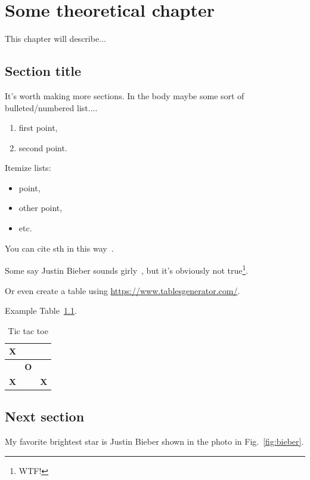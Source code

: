 
\chapter{Some theoretical chapter}

This chapter will describe...

\section{Section title}

It's worth making more sections.
In the body maybe some sort of bulleted/numbered list....

\begin{enumerate}
    \item first point,
    \item second point.
\end{enumerate}

Itemize lists:

\begin{itemize}
    \item point,
    \item other point,
    \item etc.
\end{itemize}

You can cite sth in this way~\cite{shapiro2010justin}. 

Some say Justin Bieber sounds girly~\cite{allen2015justin}, but it's obviously not true\footnote{WTF!}.

Or even create a table using \url{https://www.tablesgenerator.com/}.

Example Table~\ref{tab:oix}.

\begin{table}[ht]
\caption{Tic tac toe}
\label{tab:oix}
\centering
\begin{tabular}{|l|l|l|}
\hline
\textbf{X} & \textbf{}  & \textbf{}  \\ \hline
\textbf{}  & \textbf{O} & \textbf{}  \\ \hline
\textbf{X} & \textbf{}  & \textbf{X} \\ \hline
\end{tabular}
\end{table}

\section{Next section}

My favorite brightest star is Justin Bieber shown in the photo in Fig.~\ref{fig:bieber}.

